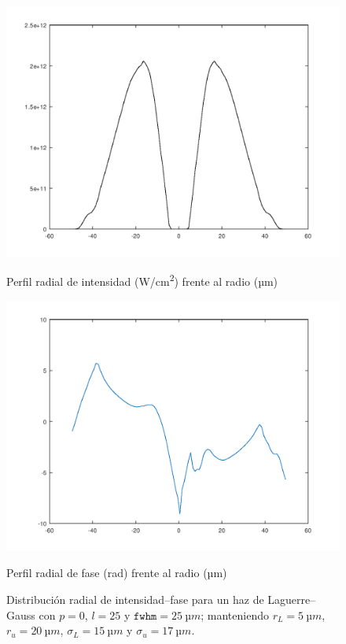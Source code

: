 \begin{figure}[htbp]
  \centering
  \begin{subcaptionblock}{.4\textwidth}
    \centering
    \includegraphics[width=\textwidth]{Figuras/ch4_int_ase.png}
    \caption{Perfil radial de intensidad (\unit{W/cm^2}) frente al radio (\unit{µm})}\label{fig:ch4_ase1}
  \end{subcaptionblock}
  \begin{subcaptionblock}{.4\textwidth}
    \centering
    \includegraphics[width=\textwidth]{Figuras/ch4_fs_ase.png}
    \caption{Perfil radial de fase (\unit{rad}) frente al radio (\unit{µm})}\label{fig:ch4_ase2}
  \end{subcaptionblock}
   \caption{Distribución radial de intensidad--fase para un haz de Laguerre--Gauss con $p=0$, $l=25$ y $\texttt{fwhm}=\qty{25}{µm}$; manteniendo $r_{L}=\qty{5}{µm}$, $r_{u}=\qty{20}{µm}$, $\sigma_{L}=\qty{15}{µm}$ y $\sigma_{u}=\qty{17}{µm}$.}
   \label{fig:4.39}
\end{figure}

